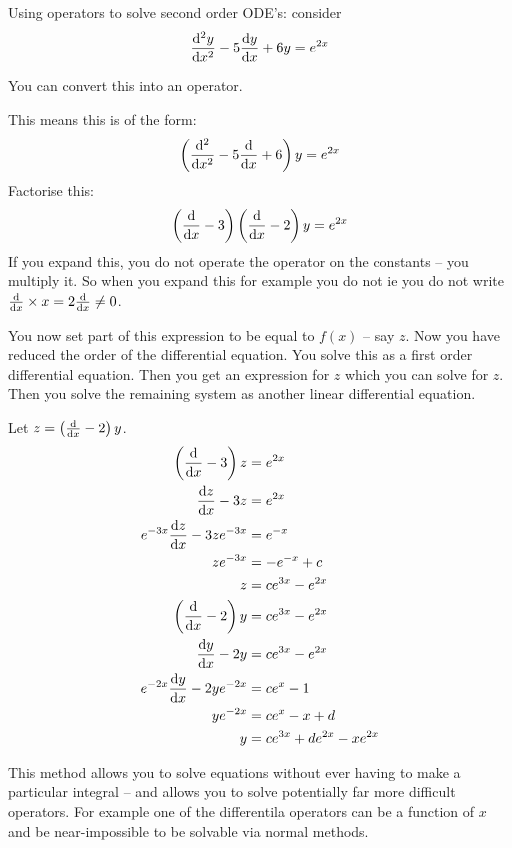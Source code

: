 \documentclass[10pt,\jkfside,a4paper]{article}
\begin{document}
Using operators to solve second order ODE's:
consider
\begin{equation}
\dv[2]{y}{x} - 5\dv{y}{x} + 6y = e^{2x}\\
\end{equation}

You can convert this into an operator.

This means this is of the form:
\begin{equation}
\left(\dv[2]{x} - 5\dv{x} + 6\right)y = e^{2x}\\
\end{equation}
Factorise this:
\begin{equation}
\left(\dv{x} - 3\right)\left(\dv{x} - 2\right)y = e^{2x}\\
\end{equation}
If you expand this, you do not operate the operator on the constants -- you multiply it.
So when you expand this for example you do not ie you do not write $\dv{x} \times x = 2\dv{x} \neq 0$.

You now set part of this expression to be equal to $f(x)$ -- say $z$. Now you have reduced the order of the 
differential equation. You solve this as a first order differential equation. Then you get an expression for $z$ 
which you can solve for $z$. Then you solve the remaining system as another linear differential equation.

Let $z = \left(\dv{x} - 2\right)y$.
\begin{equation}
\begin{split}
\left(\dv{x} - 3\right)z &= e^{2x}\\
\dv{z}{x} - 3z &= e^{2x} \\
e^{-3x}\dv{z}{x} - 3ze^{-3x} &= e^{-x} \\
ze^{-3x} &= -e^{-x} + c\\
z &= ce^{3x} - e^{2x} \\
\left(\dv{x} - 2\right)y &= ce^{3x} - e^{2x} \\
\dv{y}{x} - 2y &= ce^{3x} - e^{2x} \\
e^{-2x}\dv{y}{x} - 2ye^{-2x} &= ce^{x} - 1 \\
ye^{-2x} &= ce^{x} - x + d \\
y &= ce^{3x} + de^{2x} - xe^{2x} \\
\end{split}
\end{equation}

This method allows you to solve equations without ever having to make a particular integral -- and allows you to 
solve potentially far more difficult operators. For example one of the differentila operators can 
be a function of $x$ and be near-impossible to be solvable via normal methods.
\end{document}
